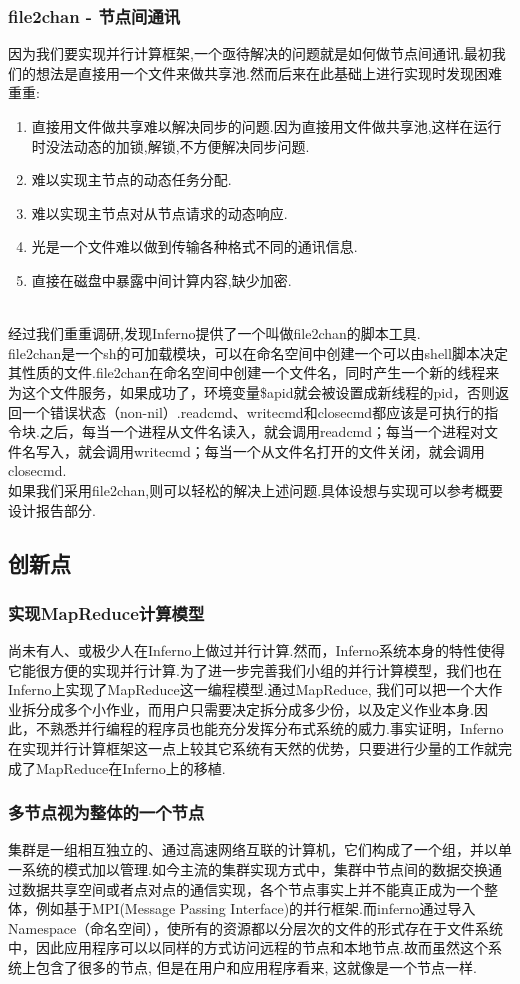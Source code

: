 \documentclass[paper=a4]{ctexart} %
\numberwithin{equation}{section} %
\numberwithin{figure}{section} %
\numberwithin{table}{section} %
\newcommand{\n}{\\\indent}
\begin{document}
\subsubsection{file2chan - 节点间通讯}
因为我们要实现并行计算框架,一个亟待解决的问题就是如何做节点间通讯.最初我们的想法是直接用一个文件来做共享池.然而后来在此基础上进行实现时发现困难重重:
\begin{enumerate}
\item 直接用文件做共享难以解决同步的问题.因为直接用文件做共享池,这样在运行时没法动态的加锁,解锁,不方便解决同步问题.
\item 难以实现主节点的动态任务分配.
\item 难以实现主节点对从节点请求的动态响应.
\item 光是一个文件难以做到传输各种格式不同的通讯信息.
\item 直接在磁盘中暴露中间计算内容,缺少加密.
\end{enumerate}
~\n
经过我们重重调研,发现Inferno提供了一个叫做file2chan的脚本工具.\n
file2chan是一个sh的可加载模块，可以在命名空间中创建一个可以由shell脚本决定其性质的文件.file2chan在命名空间中创建一个文件名，同时产生一个新的线程来为这个文件服务，如果成功了，环境变量\$apid就会被设置成新线程的pid，否则返回一个错误状态（non-nil）.readcmd、writecmd和closecmd都应该是可执行的指令块.之后，每当一个进程从文件名读入，就会调用readcmd；每当一个进程对文件名写入，就会调用writecmd；每当一个从文件名打开的文件关闭，就会调用closecmd.\n
如果我们采用file2chan,则可以轻松的解决上述问题.具体设想与实现可以参考概要设计报告部分.

\subsection{创新点}

\subsubsection{实现MapReduce计算模型}
尚未有人、或极少人在Inferno上做过并行计算.然而，Inferno系统本身的特性使得它能很方便的实现并行计算.为了进一步完善我们小组的并行计算模型，我们也在Inferno上实现了MapReduce这一编程模型.通过MapReduce, 我们可以把一个大作业拆分成多个小作业，而用户只需要决定拆分成多少份，以及定义作业本身.因此，不熟悉并行编程的程序员也能充分发挥分布式系统的威力.事实证明，Inferno在实现并行计算框架这一点上较其它系统有天然的优势，只要进行少量的工作就完成了MapReduce在Inferno上的移植.

\subsubsection{多节点视为整体的一个节点}
集群是一组相互独立的、通过高速网络互联的计算机，它们构成了一个组，并以单一系统的模式加以管理.如今主流的集群实现方式中，集群中节点间的数据交换通过数据共享空间或者点对点的通信实现，各个节点事实上并不能真正成为一个整体，例如基于MPI(Message Passing Interface)的并行框架.而inferno通过导入Namespace（命名空间），使所有的资源都以分层次的文件的形式存在于文件系统中，因此应用程序可以以同样的方式访问远程的节点和本地节点.故而虽然这个系统上包含了很多的节点, 但是在用户和应用程序看来, 这就像是一个节点一样. 
\end{document}
